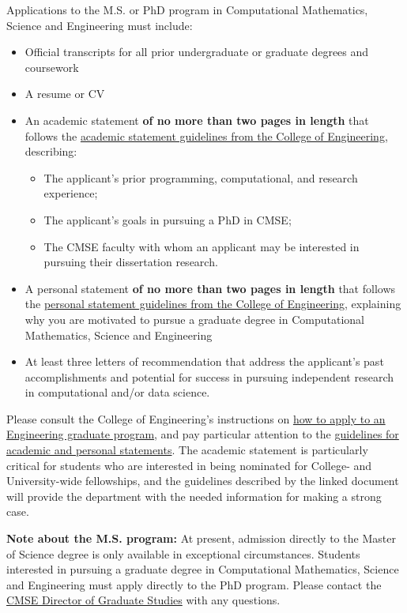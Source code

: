 Applications to the M.S. or PhD program in Computational Mathematics, Science and
Engineering must include:

\begin{itemize}
\item Official transcripts for all prior undergraduate or graduate degrees and coursework
\item A resume or CV
\item An academic statement \textbf{of no more than two pages in
    length} that follows the
  \href{http://www.egr.msu.edu/academics/graduate/academic-personal-statements-guidelines/#academic}{academic
    statement
    guidelines from the College of Engineering}, 
  describing:  

\begin{itemize}
  \item The applicant's prior programming, computational, and research experience;  
  \item The applicant's goals in pursuing a PhD in CMSE;  
  \item  The CMSE faculty with whom an applicant may be interested in
    pursuing their dissertation research.  
\end{itemize}

\item A personal statement \textbf{of no more than two pages in
    length} that follows the
  \href{http://www.egr.msu.edu/academics/graduate/academic-personal-statements-guidelines/#personal}{personal
    statement
    guidelines from the College of Engineering}, explaining
why you are motivated to pursue
  a graduate degree in Computational Mathematics, Science and Engineering

\item At least three letters of recommendation that address the
  applicant's past accomplishments and potential for success in
  pursuing independent research in computational and/or data science.

\end{itemize}

Please consult the College of Engineering's instructions on
\href{http://www.egr.msu.edu/academics/graduate/how-to-apply}{how to
apply to an Engineering graduate program}, and pay particular
attention to the
\href{http://www.egr.msu.edu/academics/graduate/academic-personal-statements-guidelines/}{guidelines
for academic and personal statements}.  The academic statement is
particularly critical for students who are interested in being
nominated for College- and University-wide fellowships, and the
guidelines described by the linked document will provide the
department with the needed information for making a strong case.

\noindent \textbf{Note about the M.S. program:} At present, admission
directly to the Master of Science degree is only available in
exceptional circumstances.  Students interested in pursuing a graduate
degree in Computational Mathematics, Science and Engineering must
apply directly to the PhD program.  Please contact the
\href{mailto:cmsegrad@msu.edu}{CMSE Director of Graduate Studies} with
any questions.
